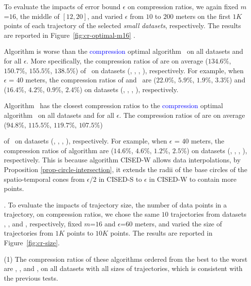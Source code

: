 {{%
To evaluate the impacts of error bound $\epsilon$ on compression ratios, we again fixed {$m$=$16$}, the middle of $[12, 20]$, and varied $\epsilon$ from $10$ to $200$ meters on the first $1K$ points of each trajectory of the selected \textit{small datasets}, respectively.
The results are reported in Figure~\ref{fig:cr-optimal-m16} .

 Algorithm \cist is worse than the \textcolor{blue}{compression} optimal algorithm \osed~on all datasets and for all $\epsilon$.
More specifically, the compression ratios of \cist are on average ($134.6\%$, $150.7\%$, $155.5\%$, $138.5\%$) of \osed~on {datasets (\sercar, \geolife, \mopsi, \pricar)}, respectively.
For example, when $\epsilon$ = $40$ meters, the compression ratios of \cist and \osed~are
($22.0\%$, $5.9\%$, $1.9\%$, $3.3\%$) and {($16.4\%$, $4.2\%$, $0.9\%$, $2.4\%$)}
on  {datasets (\sercar, \geolife, \mopsi, \pricar)}, respectively.

 Algorithm \cista~has the closest compression ratios to the \textcolor{blue}{compression} optimal algorithm \osed~on all datasets and for all $\epsilon$.
The compression ratios of \cista are on average  ($94.8\%$, $115.5\%$, $119.7\%$, $107.5\%$)} of \osed~on {datasets (\sercar, \geolife, \mopsi, \pricar)}, respectively.
For example, when $\epsilon$ = $40$ meters, the compression ratios of algorithm
\cista are ($14.6\%$, $4.6\%$, $1.2\%$, $2.5\%$) on datasets (\sercar, \geolife, \mopsi, \pricar), respectively.
%
{ This is because algorithm CISED-W allows data interpolations, by Proposition \ref{prop-circle-intersection}, it extends the radii of the base circles of the spatio-temporal cones from $\epsilon/2$ in CISED-S to $\epsilon$ in CISED-W to contain more points.}

.
To evaluate the impacts of trajectory size, \ie the number of data points in a trajectory, on compression ratios,
we chose the same {$10$} trajectories from datasets \sercar, \geolife, \mopsi and \pricar, respectively,
fixed {$m$=$16$} and $\epsilon$=$60$ meters, and varied the size  of trajectories from $1K$ points to $10K$ points.
%
The results are reported in Figure~\ref{fig:cr-size}.

\ni(1) The compression ratios of these algorithms ordered from the best to the worst are \cista, \dps, \cist and \squishe, on all datasets with all sizes of trajectories, {which is consistent with the previous tests}.

}
